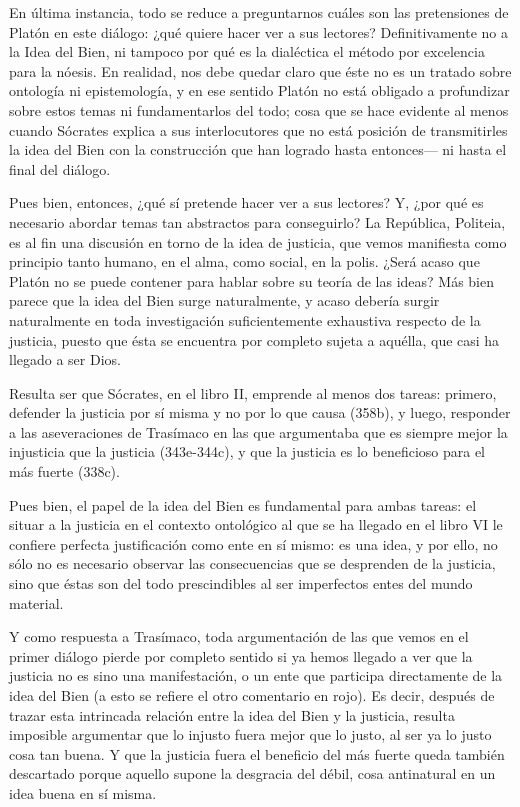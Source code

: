 En última instancia, todo se reduce a
preguntarnos cuáles son las pretensiones de
Platón en este diálogo: ¿qué quiere hacer ver
a sus lectores? Definitivamente no a la Idea
del Bien, ni tampoco por qué es la dialéctica
el método por excelencia para la nóesis. En
realidad, nos debe quedar claro que éste no
es un tratado sobre ontología ni
epistemología, y en ese sentido Platón no
está obligado a profundizar sobre estos temas
ni fundamentarlos del todo; cosa que se hace
evidente al menos cuando Sócrates explica a
sus interlocutores que no está posición de
transmitirles la idea del Bien con la
construcción que han logrado hasta
entonces--- ni hasta el final del diálogo.

Pues bien, entonces, ¿qué sí pretende hacer
ver a sus lectores? Y, ¿por qué es necesario
abordar temas tan abstractos para
conseguirlo? La República, Politeia, es al
fin una discusión en torno de la idea de
justicia, que vemos manifiesta como principio
tanto humano, en el alma, como social, en la
polis. ¿Será acaso que Platón no se puede
contener para hablar sobre su teoría de las
ideas? Más bien parece que la idea del Bien
surge naturalmente, y acaso debería surgir
naturalmente en toda investigación
suficientemente exhaustiva respecto de la
justicia, puesto que ésta se encuentra por
completo sujeta a aquélla, que casi ha
llegado a ser Dios.

Resulta ser que Sócrates, en el libro II,
emprende al menos dos tareas: primero,
defender la justicia por sí misma y no por lo
que causa (358b), y luego, responder a las
aseveraciones de Trasímaco en las que
argumentaba que es siempre mejor la
injusticia que la justicia (343e-344c), y que
la justicia es lo beneficioso para el más
fuerte (338c).

Pues bien, el papel de la idea del Bien es
fundamental para ambas tareas: el situar a la
justicia en el contexto ontológico al que se
ha llegado en el libro VI le confiere
perfecta justificación como ente en sí mismo:
es una idea, y por ello, no sólo no es
necesario observar las consecuencias que se
desprenden de la justicia, sino que éstas son
del todo prescindibles al ser imperfectos
entes del mundo material.

Y como respuesta a Trasímaco, toda
argumentación de las que vemos en el primer
diálogo pierde por completo sentido si ya
hemos llegado a ver que la justicia no es
sino una manifestación, o un ente que
participa directamente de la idea del Bien (a
esto se refiere el otro comentario en rojo).
Es decir, después de trazar esta intrincada
relación entre la idea del Bien y la
justicia, resulta imposible argumentar que lo
injusto fuera mejor que lo justo, al ser ya
lo justo cosa tan buena. Y que la justicia
fuera el beneficio del más fuerte queda
también descartado porque aquello supone la
desgracia del débil, cosa antinatural en un
idea buena en sí misma.


